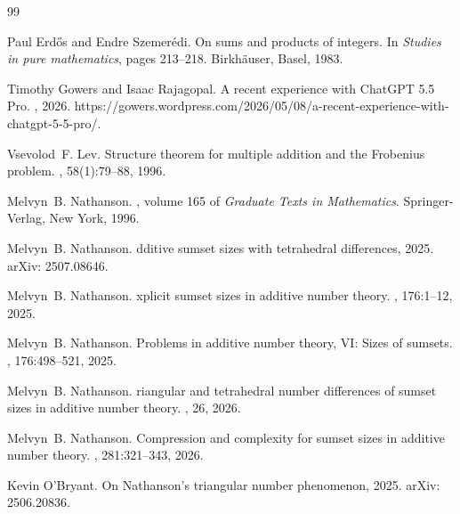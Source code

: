 \documentclass{daj}
\theoremstyle{definition}
\theoremstyle{remark}
\numberwithin{equation}{section}
\numberwithin{theorem}{section}
\begin{document}

\begin{thebibliography}{99}

Paul Erd\H{o}s and Endre Szemer\'edi.
\newblock On sums and products of integers.
\newblock In {\em Studies in pure mathematics}, pages 213--218. Birkh\"auser, Basel, 1983.

Timothy Gowers and Isaac Rajagopal.
\newblock A recent experience with {C}hat{GPT} 5.5 {P}ro.
, 2026.
\newblock https://gowers.wordpress.com/2026/05/08/a-recent-experience-with-chatgpt-5-5-pro/.

Vsevolod~F. Lev.
\newblock Structure theorem for multiple addition and the {F}robenius problem.
, 58(1):79--88, 1996.

Melvyn~B. Nathanson.
, volume 165 of {\em Graduate Texts in Mathematics}.
\newblock Springer-Verlag, New York, 1996.

Melvyn~B. Nathanson.
dditive sumset sizes with tetrahedral differences, 2025.
\newblock arXiv: 2507.08646.

Melvyn~B. Nathanson.
xplicit sumset sizes in additive number theory.
, 176:1--12, 2025.

Melvyn~B. Nathanson.
\newblock Problems in additive number theory, {VI}: Sizes of sumsets.
, 176:498--521, 2025.

Melvyn~B. Nathanson.
riangular and tetrahedral number differences of sumset sizes in additive number theory.
, 26, 2026.

Melvyn~B. Nathanson.
\newblock Compression and complexity for sumset sizes in additive number theory.
, 281:321--343, 2026.

Kevin O'Bryant.
\newblock On {N}athanson's triangular number phenomenon, 2025.
\newblock arXiv: 2506.20836.


\end{thebibliography}
\end{document}
